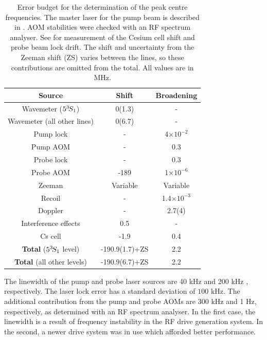\begin{table}
\centering
  \begin{tabular}{c c c}
      \hline\hline
          Source & Shift & Broadening  \\
      \hline
          Wavemeter ($5^{3\!} S_1$)& 0(1.3) & - \\
          Wavemeter (all other lines)& 0(6.7) & - \\
          Pump lock & - & 4$\times10^{-2}$ \\
          Pump AOM & - & 0.3 \\
          Probe lock & - & 0.3\\
          Probe AOM & -189 & 1$\times10^{-6}$\\
          Zeeman & Variable & Variable \\
          Recoil & - & 1.4$\times 10^{-3}$ \\ %
          Doppler & - & 2.7(4) \\
          Interference effects & 0.5 & - \\ 
          Cs cell & -1.9 & 0.4 \\
          \textbf{Total} ($5^{3\!} S_1$ level) & -190.9(1.7)+ZS& 2.2\\
          \textbf{Total} (all other levels) & -190.9(6.7)+ZS& 2.2\\
      \hline\hline
  \end{tabular}
\caption{Error budget for the determination of the peak centre frequencies.
	 The master laser for the pump beam is described in \cite{Shin16}.
	AOM stabilities were checked with an RF spectrum analyser.
	See \cite{Thomas20} for measurement of the Cesium cell shift and probe beam lock drift.
	The shift and uncertainty from the Zeeman shift (ZS) varies between the lines, so these contributions are omitted from the total.
	All values are in MHz.}
  \label{tab:errors}
  
\end{table}

	The linewidth of the pump and probe laser sources are 40 kHz \cite{Shin16} and 200 kHz \cite{Thomas20}, respectively.
	The laser lock error has a standard deviation of $100$ kHz.
	The additional contribution from the pump and probe AOMs are 300 kHz and 1 Hz, respectively, as determined with an RF spectrum analyser.
	In the first case, the linewidth is a result of frequency instability in the RF drive generation system. In the second, a newer drive system was in use which afforded better performance.
	

